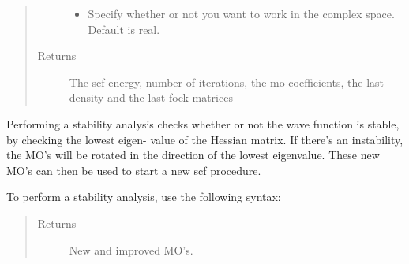 \documentclass[letterpaper,10pt,english]{sphinxmanual}
\begin{document}
\begin{fulllineitems}
\begin{fulllineitems}
\begin{quote}
\begin{description}
\begin{itemize}
\item {} 
 \textendash{} Specify whether or not you want to work in the complex space. Default is real.

\end{itemize}

\item[{Returns}] \leavevmode
The scf energy, number of iterations, the mo coefficients, the last density and the last fock matrices

\end{description}\end{quote}

\end{fulllineitems}


\begin{fulllineitems}
\label{\detokenize{UHF:hf.HartreeFock.UHF.MF.stability}}
Performing a stability analysis checks whether or not the wave function is stable, by checking the lowest eigen-
value of the Hessian matrix. If there’s an instability, the MO’s will be rotated in the direction
of the lowest eigenvalue. These new MO’s can then be used to start a new scf procedure.

To perform a stability analysis, use the following syntax:

\begin{sphinxVerbatim}[commandchars=\\\{\}]
   
           
   
  
\end{sphinxVerbatim}
\begin{quote}\begin{description}
\item[{Returns}] \leavevmode
New and improved MO’s.


\end{description}
\end{quote}
\end{fulllineitems}
\end{fulllineitems}
\end{document}
